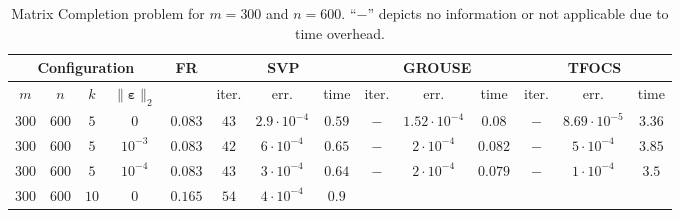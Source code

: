 \documentclass[twocolumn]{svjour3}
\newcommand{\vectornormbig}[1]{\big\|#1\big\|}
\newcommand{\noise}{\boldsymbol{\varepsilon}}
\newcommand{\rank}{k}
\begin{document}
\begin{table*}[!htp]
\caption{Matrix Completion problem for $m = 300$ and $n = 600$. ``$-$'' depicts no information or not applicable due to time overhead.} {\label{table:2}}
\begin{center}
\begin{tabular}{|c|c|c|c|c|c|c|c|c|c|c|c|c|c|}
\multicolumn{4}{c|}{Configuration} & FR & \multicolumn{3}{|c|}{SVP} & \multicolumn{3}{|c|}{GROUSE} & \multicolumn{3}{|c}{TFOCS} \\
\hline \hline
\multicolumn{1}{c}{$m$} & \multicolumn{1}{c}{$n$} & \multicolumn{1}{c}{$\rank$} & \multicolumn{1}{c|}{$\vectornormbig{\noise}_2$} & & 
\multicolumn{1}{|c}{\rm{iter.}} & \multicolumn{1}{c}{\rm{err.}} & \multicolumn{1}{c|}{\rm{time}} &
\multicolumn{1}{|c}{\rm{iter.}} & \multicolumn{1}{c}{\rm{err.}} & \multicolumn{1}{c|}{\rm{time}} &
\multicolumn{1}{|c}{\rm{iter.}} & \multicolumn{1}{c}{\rm{err.}} & \multicolumn{1}{c}{\rm{time}} \\
\hline\hline
\multicolumn{1}{c}{$300$} & \multicolumn{1}{c}{$600$} & \multicolumn{1}{c}{$5$} & \multicolumn{1}{c|}{$0$} & $0.083$ & 
\multicolumn{1}{|c}{$43$} & \multicolumn{1}{c}{$2.9\cdot 10^{-4}$} & \multicolumn{1}{c|}{$0.59$} &
\multicolumn{1}{|c}{$-$} & \multicolumn{1}{c}{$1.52\cdot10^{-4}$} & \multicolumn{1}{c|}{$0.08$} &
\multicolumn{1}{|c}{$-$} & \multicolumn{1}{c}{$8.69\cdot10^{-5}$} & \multicolumn{1}{c}{$3.36$} \\
\hline
\multicolumn{1}{c}{$300$} & \multicolumn{1}{c}{$600$} & \multicolumn{1}{c}{$5$} & \multicolumn{1}{c|}{$10^{-3}$} & $0.083$ & 
\multicolumn{1}{|c}{$42$} & \multicolumn{1}{c}{$6\cdot 10^{-4}$} & \multicolumn{1}{c|}{$0.65$} &
\multicolumn{1}{|c}{$-$} & \multicolumn{1}{c}{$2\cdot10^{-4}$} & \multicolumn{1}{c|}{$0.082$} &
\multicolumn{1}{|c}{$-$} & \multicolumn{1}{c}{$5\cdot10^{-4}$} & \multicolumn{1}{c}{$3.85$} \\
\hline
\multicolumn{1}{c}{$300$} & \multicolumn{1}{c}{$600$} & \multicolumn{1}{c}{$5$} & \multicolumn{1}{c|}{$10^{-4}$} & $0.083$ & 
\multicolumn{1}{|c}{$43$} & \multicolumn{1}{c}{$3\cdot 10^{-4}$} & \multicolumn{1}{c|}{$0.64$} &
\multicolumn{1}{|c}{$-$} & \multicolumn{1}{c}{$2\cdot10^{-4}$} & \multicolumn{1}{c|}{$0.079$} &
\multicolumn{1}{|c}{$-$} & \multicolumn{1}{c}{$1\cdot10^{-4}$} & \multicolumn{1}{c}{$3.5$} \\
\hline
\multicolumn{1}{c}{$300$} & \multicolumn{1}{c}{$600$} & \multicolumn{1}{c}{$10$} & \multicolumn{1}{c|}{$0$} & $0.165$ & 
\multicolumn{1}{|c}{$54$} & \multicolumn{1}{c}{$4\cdot 10^{-4}$} & \multicolumn{1}{c|}{$0.9$} &

\end{tabular}
\end{center}
\end{table*}
\end{document}

